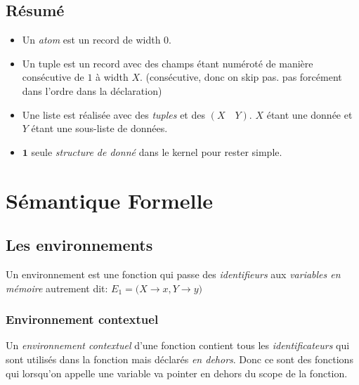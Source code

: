 \documentclass{report}
\begin{document}
\subsection{Résumé}
\begin{itemize}
\item Un \textit{atom} est un record de width $0$.
\item Un tuple est un record avec des champs étant numéroté de manière consécutive de $1$ à width $X$. (consécutive, donc on skip pas. pas forcément dans l'ordre dans la déclaration)
\item Une liste est réalisée avec des \textit{tuples} et des $(X \quad Y)$. $X$ étant une donnée et $Y$ étant une sous-liste de données.
\item $\textbf{1}$ seule \textit{structure de donné} dans le kernel pour rester simple.
\end{itemize}

\section{Sémantique Formelle}
\subsection{Les environnements}
Un environnement est une fonction qui passe des \textit{identifieurs} aux \textit{variables en mémoire} autrement dit: $E_1 = ({X \rightarrow x, Y \rightarrow y)}$

\subsubsection{Environnement contextuel}
Un \textit{environnement contextuel} d'une fonction contient tous les \textit{identificateurs} qui sont utilisés dans la fonction mais déclarés \textit{en dehors}. Donc ce sont des fonctions qui lorsqu'on appelle une variable va pointer en dehors du scope de la fonction.
\end{document}
